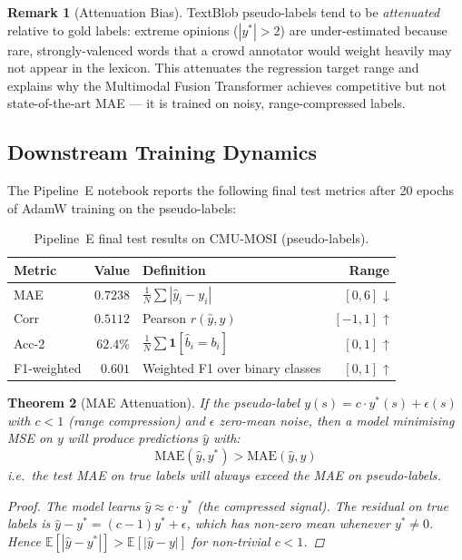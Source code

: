 \documentclass[12pt,a4paper]{article}
\theoremstyle{plain}
\newtheorem{theorem}{Theorem}[section]
\theoremstyle{definition}
\newtheorem{remark}[theorem]{Remark}
\begin{document}
\begin{remark}[Attenuation Bias]
  TextBlob pseudo-labels tend to be \emph{attenuated} relative to
  gold labels: extreme opinions ($|y^*| > 2$) are under-estimated
  because rare, strongly-valenced words that a crowd annotator would
  weight heavily may not appear in the lexicon.  This attenuates the
  regression target range and explains why the Multimodal Fusion
  Transformer achieves competitive but not state-of-the-art MAE —
  it is trained on noisy, range-compressed labels.
\end{remark}

\subsection{Downstream Training Dynamics}

The Pipeline~E notebook reports the following final test metrics after
20 epochs of AdamW training on the pseudo-labels:

\begin{table}[H]
\centering
\caption{Pipeline~E final test results on CMU-MOSI (pseudo-labels).}
\label{tab:results}
\begin{tabular}{lrlr}
\toprule
Metric & Value & Definition & Range \\
\midrule
MAE  & $0.7238$ & $\frac{1}{N}\sum|\hat{y}_i - y_i|$ & $[0, 6]$ ↓ \\
Corr & $0.5112$ & Pearson $r(\hat{y}, y)$             & $[-1,1]$ ↑ \\
Acc-2 & $62.4\%$ & $\frac{1}{N}\sum\mathbf{1}[\hat{b}_i = b_i]$ & $[0,1]$ ↑ \\
F1-weighted & $0.601$ & Weighted F1 over binary classes & $[0,1]$ ↑ \\
\bottomrule
\end{tabular}
\end{table}

\begin{theorem}[MAE Attenuation]
\label{thm:attenuation}
  If the pseudo-label $y(s) = c \cdot y^*(s) + \epsilon(s)$ with
  $c < 1$ (range compression) and $\epsilon$ zero-mean noise, then
  a model minimising MSE on $y$ will produce predictions $\hat{y}$
  with:
  \[
    \text{MAE}(\hat{y}, y^*) >
    \text{MAE}(\hat{y}, y)
  \]
  i.e.\ the test MAE on true labels will always exceed the MAE on
  pseudo-labels.
  \begin{proof}
    The model learns $\hat{y} \approx c \cdot y^*$ (the compressed
    signal).  The residual on true labels is
    $\hat{y} - y^* = (c-1) y^* + \epsilon$, which has non-zero
    mean whenever $y^* \ne 0$.  Hence
    $\mathbb{E}[|\hat{y} - y^*|] > \mathbb{E}[|\hat{y} - y|]$
    for non-trivial $c < 1$.
  \end{proof}
\end{theorem}
\end{document}

